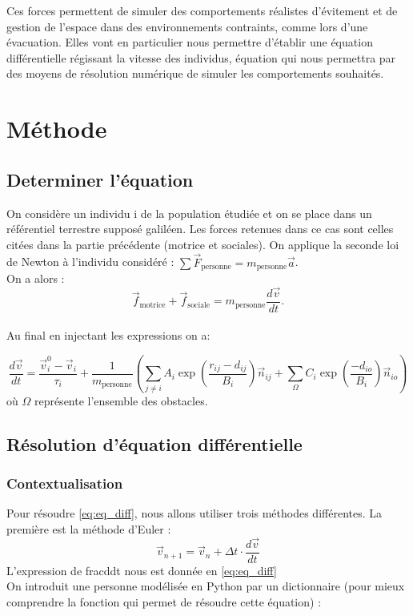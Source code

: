 \documentclass[a4paper,12pt]{article}
\begin{document}
Ces forces permettent de simuler des comportements réalistes d’évitement et de gestion de l’espace dans des environnements contraints, comme lors d’une évacuation. Elles vont en particulier nous permettre d'établir une équation différentielle régissant la vitesse des individus, équation qui nous permettra par des moyens de résolution numérique de simuler les comportements souhaités.


\section{Méthode}

\subsection{Determiner l'équation}

\indent On considère un individu i de la population étudiée et on se place dans un référentiel terrestre supposé galiléen. Les forces retenues dans ce cas sont celles citées dans la partie précédente (motrice et sociales). On applique la seconde loi de Newton à l'individu considéré : $\sum \vec{F}_{\text{personne}} = m_{\text{personne}} \vec{a}$.
\\On a alors :
\[
\vec{f}_{\text{motrice}} + \vec{f}_{\text{sociale}} = m_{\text{personne}} \frac{d\vec{v}}{dt}.
\]
\\ Au final en injectant les expressions on a:

\begin{equation}
\label{eq:eq_diff}
\frac{d\vec{v}}{dt} = \frac{\vec{v}_i^0 - \vec{v}_i}{\tau_i} + \frac{1}{m_{\text{personne}}}( \sum_{j \neq i}  A_i \exp\left( \frac{r_{ij} - d_{ij}}{B_i} \right) \vec{n}_{ij} +  \sum_{\Omega} C_i \exp\left( \frac{- d_{io}}{B_i} \right) \vec{n}_{io})
\end{equation}
où $\Omega$ représente l'ensemble des obstacles.

\subsection{Résolution d'équation différentielle}
\subsubsection{Contextualisation}

\indent Pour résoudre \eqref{eq:eq_diff}, nous allons utiliser trois méthodes différentes. La première est la méthode d'Euler : 
\[
\vec{v}_{n+1} = \vec{v}_n + \Delta t \cdot \frac{d\vec{v}}{dt}
\]
L'expression de frac{d}{dt} nous est donnée en \eqref{eq:eq_diff}
\\ On introduit une personne modélisée en Python par un dictionnaire (pour mieux comprendre la fonction qui permet de résoudre cette équation) :
\end{document}
